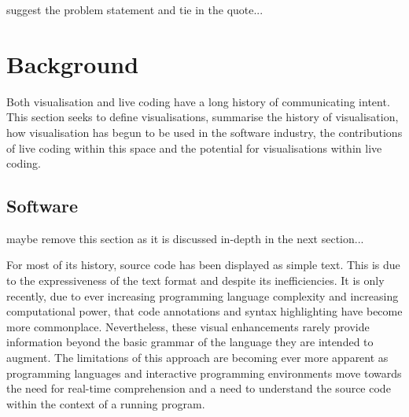 

 {\color{red} suggest the problem statement and tie in the quote...}

\section{Background}

Both visualisation and live coding have a long history of communicating intent. This section seeks to define visualisations, summarise the history of visualisation, how visualisation has begun to be used in the software industry, the contributions of live coding within this space and the potential for visualisations within live coding.

\subsection{Software}
{\color{red} maybe remove this section as it is discussed in-depth in the next section...}

For most of its history, source code has been displayed as simple text. This is due to the expressiveness of the text format and despite its inefficiencies. It is only recently, due to ever increasing programming language complexity and increasing computational power, that code annotations and syntax highlighting have become more commonplace. Nevertheless, these visual enhancements rarely provide information beyond the basic grammar of the language they are intended to augment. The limitations of this approach are becoming ever more apparent as programming languages and interactive programming environments move towards the need for real-time comprehension and a need to understand the source code within the context of a running program.


